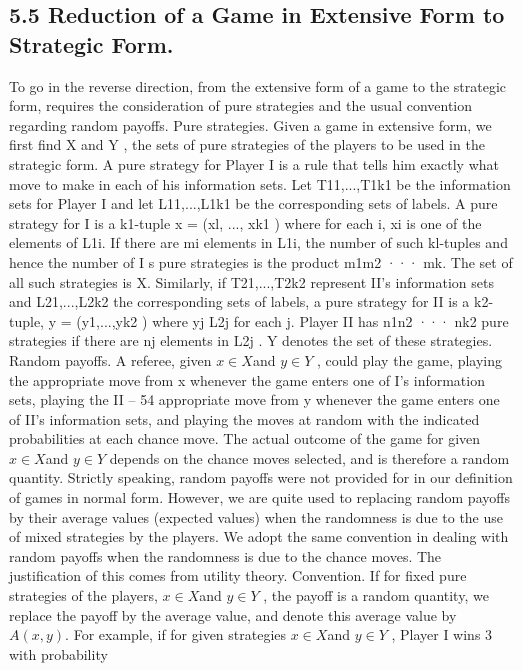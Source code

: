 \subsection{5.5 Reduction of a Game in Extensive Form to Strategic Form.} To go in
the reverse direction, from the extensive form of a game to the strategic form, requires the
consideration of pure strategies and the usual convention regarding random payoffs.
Pure strategies. Given a game in extensive form, we first find X and Y , the sets of
pure strategies of the players to be used in the strategic form. A pure strategy for Player
I is a rule that tells him exactly what move to make in each of his information sets. Let
T11,...,T1k1 be the information sets for Player I and let L11,...,L1k1 be the corresponding
sets of labels. A pure strategy for I is a k1-tuple x = (xl, ..., xk1 ) where for each i, xi is one
of the elements of L1i. If there are mi elements in L1i, the number of such kl-tuples and
hence the number of I s pure strategies is the product m1m2 ··· mk. The set of all such
strategies is X. Similarly, if T21,...,T2k2 represent II’s information sets and L21,...,L2k2
the corresponding sets of labels, a pure strategy for II is a k2-tuple, y = (y1,...,yk2 ) where
yj \in L2j for each j. Player II has n1n2 ··· nk2 pure strategies if there are nj elements in
L2j . Y denotes the set of these strategies.
Random payoffs. A referee, given $x \in X $and $y \in Y $ , could play the game, playing the
appropriate move from x whenever the game enters one of I’s information sets, playing the
II – 54
appropriate move from y whenever the game enters one of II’s information sets, and playing
the moves at random with the indicated probabilities at each chance move. The actual
outcome of the game for given $x \in X $and $y \in Y $ depends on the chance moves selected,
and is therefore a random quantity. Strictly speaking, random payoffs were not provided
for in our definition of games in normal form. However, we are quite used to replacing
random payoffs by their average values (expected values) when the randomness is due to
the use of mixed strategies by the players. We adopt the same convention in dealing with
random payoffs when the randomness is due to the chance moves. The justification of this
comes from utility theory.
Convention. If for fixed pure strategies of the players, $x \in X $and $y \in Y $ , the payoff is
a random quantity, we replace the payoff by the average value, and denote this average
value by $A(x, y)$.
For example, if for given strategies $x \in X $and $y \in Y $ , Player I wins 3 with probability
